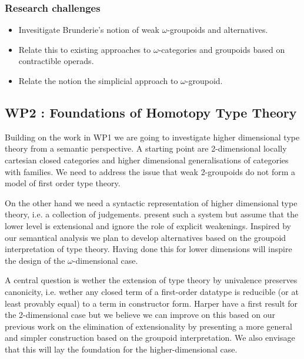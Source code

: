 \documentclass[twocolumn,a4paper,11pt]{article}
\begin{document}
{\subsubsection*{Research challenges}
\label{sec:rsearch-challenges}
\begin{itemize}
\item Invesitigate Brunderie's notion of weak $\omega$-groupoids and alternatives.
\item Relate this to existing approaches to $\omega$-categories and
  groupoids based on contractible operads.
\item Relate the notion the simplicial approach to $\omega$-groupoid.
\end{itemize}


\subsection*{WP2 : Foundations of Homotopy Type Theory}

Building on the work in WP1 we are going to investigate higher
dimensional type theory from a semantic perspective. A starting point
are 2-dimensional locally cartesian closed categories and
higher dimensional generalisations of categories with families. We
need to address the issue that weak 2-groupoids do not form a model of
first order type theory. 

On the other hand we need a syntactic representation of higher
dimensional type theory, i.e. a collection of
judgements. \cite{licataHarper:canonicity2d} present such a system but assume that
the lower level is extensional and ignore the role of explicit
weakenings. Inspired by our semantical analysis we plan to develop
alternatives based on the groupoid interpretation of type theory.
Having done this for lower dimensions will inspire the design of
the $\omega$-dimensional case.

A central question is wether the extension of type theory by
univalence preserves canonicity, i.e. wether any closed term of a
first-order datatype is reducible (or at least provably equal) to a
term in constructor form. Harper \cite{licataHarper:canonicity2d} have
a first result for the 2-dimensional case but we believe we can
improve on this based on our previous work on the elimination of
extensionality \cite{altenkirch:extSetoids,altenMcBSwier07:beast} by
presenting a more general and simpler construction based on the
groupoid interpretation. We also envisage that this will lay the
foundation for the higher-dimensional case.

}
\end{document}
